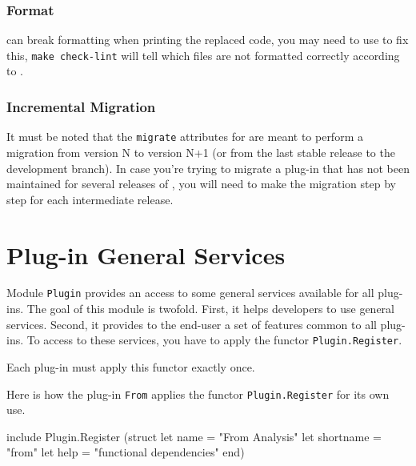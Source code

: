 \subsubsection{Format}

\ocamlmig can break \ocaml formatting when printing the replaced code, you may
need to use \ocpindent to fix this, \lstinline{make check-lint} will tell which
files are not formatted correctly according to \ocpindent.

\subsubsection{Incremental Migration}

It must be noted that the \lstinline{migrate} attributes for \ocamlmig are
meant to perform a migration from \framac version N to \framac version N+1 (or
from the last stable release to the development branch). In case you're trying
to migrate a plug-in that has not been maintained for several releases
of \framac, you will need to make the migration step by step for each
intermediate release.


\section{Plug-in General Services}\label{adv:plugin-services}

Module \texttt{Plugin} provides an access to some general
services available for all plug-ins. The goal of this module is twofold. First,
it helps developers to use general \framac services. Second, it provides to the
end-user a set of features common to all plug-ins. To access to these services,
you have to apply the functor
\texttt{Plugin.Register}.

\begin{important}
Each plug-in must apply this functor exactly once.
\end{important}

\begin{example}
Here is how the plug-in \texttt{From} applies the functor
\texttt{Plugin.Register} for its own use.
\begin{ocamlcode}
include Plugin.Register
  (struct
     let name = "From Analysis"
     let shortname = "from"
     let help = "functional dependencies"
   end)
\end{ocamlcode}
\end{example}


